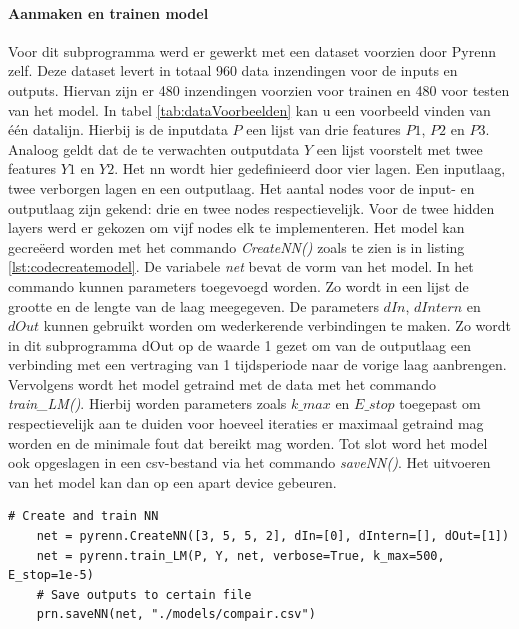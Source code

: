 			\paragraph{Aanmaken en trainen model}
			Voor dit subprogramma werd er gewerkt met een dataset voorzien door Pyrenn zelf. Deze dataset levert in totaal 960 data inzendingen voor de inputs en outputs. Hiervan zijn er 480 inzendingen voorzien voor trainen en 480 voor testen van het model. In tabel \ref{tab:dataVoorbeelden} kan u een voorbeeld vinden van \'e\'en datalijn. Hierbij is de inputdata $P$ een lijst van drie features $P1$, $P2$ en $P3$. Analoog geldt dat de te verwachten outputdata $Y$ een lijst voorstelt met twee features $Y1$ en $Y2$. Het \gls{nn} wordt hier gedefinieerd door vier lagen. Een inputlaag, twee verborgen lagen en een outputlaag. Het aantal nodes voor de input- en outputlaag zijn gekend: drie en twee nodes respectievelijk. Voor de twee hidden layers werd er gekozen om vijf nodes elk te implementeren.
			Het model kan gecre\"eerd worden met het commando \textit{CreateNN()} zoals te zien is in listing \ref{lst:codecreatemodel}. De variabele \textit{net} bevat de vorm van het model. In het commando kunnen parameters toegevoegd worden. Zo wordt in een lijst de grootte en de lengte van de laag meegegeven. De parameters $dIn$, $dIntern$ en $dOut$ kunnen gebruikt worden om wederkerende verbindingen te maken. Zo wordt in dit subprogramma dOut op de waarde 1 gezet om van de outputlaag een verbinding met een vertraging van 1 tijdsperiode naar de vorige laag aanbrengen. Vervolgens wordt het model getraind met de data met het commando \textit{train\_LM()}. Hierbij worden parameters zoals $k\_max$ en $E\_stop$ toegepast om respectievelijk aan te duiden voor hoeveel iteraties er maximaal getraind mag worden en de minimale fout dat bereikt mag worden. Tot slot word het model ook opgeslagen in een \gls{csv}-bestand via het commando \textit{saveNN()}. Het uitvoeren van het model kan dan op een apart device gebeuren. 

			\begin{lstlisting}[caption={Cre\"eren en trainen van pyrenn-model.},captionpos=b, label = {lst:codecreatemodel}]
	# Create and train NN
	net = pyrenn.CreateNN([3, 5, 5, 2], dIn=[0], dIntern=[], dOut=[1])
	net = pyrenn.train_LM(P, Y, net, verbose=True, k_max=500, E_stop=1e-5)
	# Save outputs to certain file
	prn.saveNN(net, "./models/compair.csv")
			\end{lstlisting}
			
